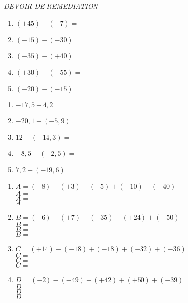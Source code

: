 \documentclass[11pt]{article}
\begin{document}

\begin{center}
\textit{DEVOIR DE REMEDIATION} \\
\end{center}

\begin{multicols}{2}

\begin{exercicedevoir}[5][Calculer]
\begin{enumerate}[itemsep=1em]
\item $(+45) - (-7)=$\dotfill
\item $(-15) - (-30)=$\dotfill
\item $(-35) - (+40)=$\dotfill
\item $(+30) - (-55)=$\dotfill
\item $(-20) - (-15)=$\dotfill
\end{enumerate}
\end{exercicedevoir}

\begin{exercicedevoir}[5][Calculer]
\begin{enumerate}[itemsep=1em]
\item $-17{,}5 - 4{,}2=$\dotfill
\item $-20{,}1 - (-5{,}9)=$\dotfill
\item $12 - (-14{,}3)=$\dotfill
\item $-8{,}5 - (-2{,}5)=$\dotfill
\item $7{,}2 - (-19{,}6)=$\dotfill
\end{enumerate}
\end{exercicedevoir}
\end{multicols}

\begin{exercicedevoir}
\begin{multicols}{2}
\begin{enumerate}[itemsep=1em,label={}]
\item  $ A =  (-8)-(+3)+(-5)+(-10)+(-40)$\\$ A =$ \\$ A =$\\$ A =$
\item  $ B =  (-6)-(+7)+(-35)-(+24)+(-50)$\\$ B =$ \\$ B =$\\$ B =$
\item  $ C =  (+14)-(-18)+(-18)+(-32)+(-36)$\\$ C =$ \\$ C =$\\$ C =$
\item  $ D =  (-2)-(-49)-(+42)+(+50)+(-39)$\\$ D =$ \\$ D =$\\$ D =$
\end{enumerate}
\end{multicols}
\end{exercicedevoir}
\end{document}
